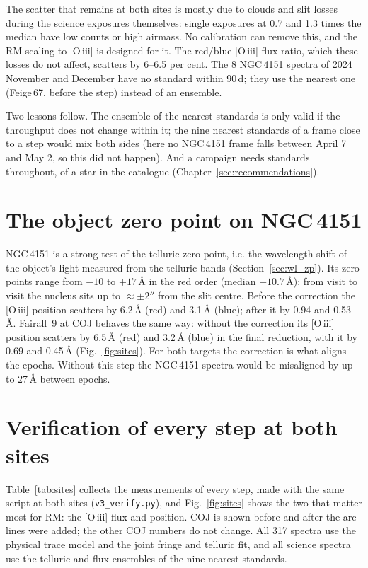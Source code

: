 The scatter that remains at both sites is mostly due to clouds and slit losses during the science exposures
themselves: single exposures at 0.7 and 1.3 times the median have low counts or high airmass. No calibration can
remove this, and the RM scaling to [O\,{\sc iii}] is designed for it. The red/blue [O\,{\sc iii}] flux ratio, which
these losses do not affect, scatters by 6--6.5 per cent. The 8 NGC\,4151 spectra of 2024 November and December have no
standard within 90\,d; they use the nearest one (Feige\,67, before the step) instead of an ensemble.

Two lessons follow. The ensemble of the nearest standards is only valid if the throughput does not change within it;
the nine nearest standards of a frame close to a step would mix both sides (here no NGC\,4151 frame falls between
April 7 and May 2, so this did not happen). And a campaign needs standards throughout, of a star in the catalogue
(Chapter~\ref{sec:recommendations}).



\section{The object zero point on NGC\,4151}
\label{sec:sites_zp}
NGC\,4151 is a strong test of the telluric zero point, i.e. the wavelength shift of the object's light measured
from the telluric bands (Section~\ref{sec:wl_zp}). Its zero points range from $-10$ to $+17$\,\AA{} in the red order
(median $+10.7$\,\AA): from visit to visit the nucleus sits up to $\approx\pm2''$ from the slit centre. Before the correction the [O\,{\sc iii}] position scatters by 6.2\,\AA{} (red) and 3.1\,\AA{}
(blue); after it by 0.94 and 0.53\,\AA. Fairall~9 at COJ behaves the same way: without the correction its
[O\,{\sc iii}] position scatters by 6.5\,\AA{} (red) and 3.2\,\AA{} (blue) in the final reduction, with it by 0.69
and 0.45\,\AA{} (Fig.~\ref{fig:sites}). For both targets the correction is what aligns the epochs. Without this step the NGC\,4151
spectra would be misaligned by up to 27\,\AA{} between epochs.

\section{Verification of every step at both sites}
\label{sec:sites_verify}
Table~\ref{tab:sites} collects the measurements of every step, made with the same script at both sites
(\texttt{v3\_verify.py}), and Fig.~\ref{fig:sites} shows the two that matter most for RM: the [O\,{\sc iii}] flux and
position. COJ is shown before and after the arc lines were added; the other COJ numbers do not change. All 317 spectra use the physical trace model and the joint fringe and telluric fit, and all science
spectra use the telluric and flux ensembles of the nine nearest standards.

